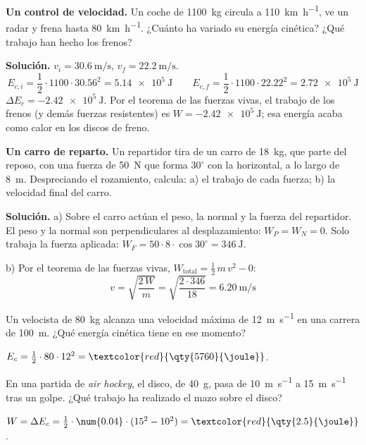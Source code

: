 \begin{example}
    \textbf{Un control de velocidad.} Un coche de \qty{1100}{\kg} circula a \qty{110}{\km\per\hour}, ve un radar y frena hasta
    \qty{80}{\km\per\hour}. ¿Cuánto ha variado su energía cinética? ¿Qué trabajo han hecho los frenos?

    \textbf{Solución.} \(v_i = \qty{30.6}{\m\per\s}\), \(v_f = \qty{22.2}{\m\per\s}\).
    \[ E_{c,i} = \frac{1}{2} \cdot 1100 \cdot \num{30.56}^2 = \qty{5.14e5}{\joule} \qquad E_{c,f} = \frac{1}{2} \cdot 1100 \cdot \num{22.22}^2
    = \qty{2.72e5}{\joule} \]
    \(\Delta E_c = \qty{-2.42e5}{\joule}\). Por el teorema de las fuerzas vivas, el trabajo de los frenos (y demás fuerzas resistentes)
    es \(W = \qty{-2.42e5}{\joule}\); esa energía acaba como calor en los discos de freno.
\end{example}

\begin{example}
    \textbf{Un carro de reparto.} Un repartidor tira de un carro de \qty{18}{\kg}, que parte del reposo, con una fuerza de
    \qty{50}{\newton} que forma \(30^\circ\) con la horizontal, a lo largo de \qty{8}{\m}. Despreciando el rozamiento, calcula: a) el
    trabajo de cada fuerza; b) la velocidad final del carro.

    \textbf{Solución.} a) Sobre el carro actúan el peso, la normal y la fuerza del repartidor. El peso y la normal son perpendiculares al
    desplazamiento: \(W_P = W_N = 0\). Solo trabaja la fuerza aplicada: \(W_F = 50 \cdot 8 \cdot \cos 30^\circ = \qty{346}{\joule}\).

    b) Por el teorema de las fuerzas vivas, \(W_{\text{total}} = \frac{1}{2}\,m\,v^2 - 0\):
    \[ v = \sqrt{\frac{2\,W}{m}} = \sqrt{\frac{2 \cdot 346}{18}} = \qty{6.20}{\m\per\s} \]
\end{example}

\begin{exercise}
    Un velocista de \qty{80}{\kg} alcanza una velocidad máxima de \qty{12}{\m\per\s} en una carrera de \qty{100}{\m}. ¿Qué energía
    cinética tiene en ese momento?
    \begin{solu}
        \(E_c = \frac{1}{2} \cdot 80 \cdot 12^2 = \textcolor{red}{\qty{5760}{\joule}}\).
    \end{solu}
\end{exercise}

\begin{exercise}
    En una partida de \textit{air hockey}, el disco, de \qty{40}{\g}, pasa de \qty{10}{\m\per\s} a \qty{15}{\m\per\s} tras un golpe.
    ¿Qué trabajo ha realizado el mazo sobre el disco?
    \begin{solu}
        \(W = \Delta E_c = \frac{1}{2} \cdot \num{0.04} \cdot (15^2 - 10^2) = \textcolor{red}{\qty{2.5}{\joule}}\).
    \end{solu}
\end{exercise}

